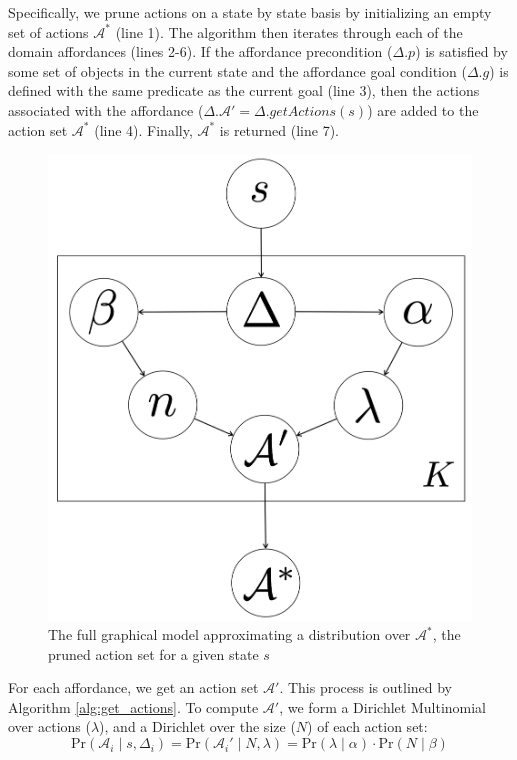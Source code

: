 \documentclass[conference]{IEEEtran}
\begin{document}
Specifically, we prune actions on a state by state basis
by initializing an empty set of actions $\mathcal{A}^*$ (line 1). The algorithm then iterates
through each of the domain affordances (lines 2-6). If the affordance
precondition ($\Delta.p$) is satisfied by some set of objects in the current state
and the affordance goal condition ($\Delta.g$) is defined with the same predicate
as the current goal (line 3), then the actions associated with the affordance ($\Delta.\mathcal{A}' = \Delta.getActions(s)$) are added to the action set $\mathcal{A}^*$ (line 4). Finally, $\mathcal{A}^*$ is returned (line 7).

\begin{figure}
\centering
\includegraphics[scale=0.15]{figures/learn_graphical_model.png}%
  \caption{The full graphical model approximating a distribution over $\mathcal{A}^*$, the pruned action set for a given state $s$}
  \label{fig:graphical_model}
\end{figure}

For each affordance, we get an action set $\mathcal{A}'$. This 
process is outlined by Algorithm \ref{alg:get_actions}. To compute $\mathcal{A}'$, we form a Dirichlet Multinomial
over actions ($\lambda$), and a Dirichlet over the size ($N$) of each action set:
\begin{equation}
\text{Pr}(\mathcal{A}_i \mid s,\Delta_i) = \text{Pr}(\mathcal{A}_i' \mid N, \lambda) = \text{Pr}(\lambda \mid \alpha) \cdot \text{Pr}(N \mid \beta)
\end{equation}
\end{document}
